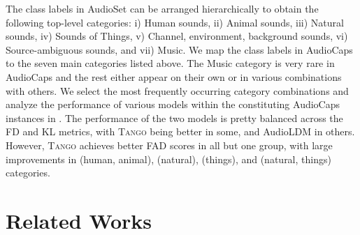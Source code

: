 \documentclass{article}
\newcommand{\model}{\textsc{Tango}}
\begin{document}
The class labels in AudioSet can be arranged hierarchically to obtain the following top-level categories: i) Human sounds, ii) Animal sounds, iii) Natural sounds, iv) Sounds of Things, v) Channel, environment, background sounds, vi) Source-ambiguous sounds, and vii) Music. We map the class labels in AudioCaps to the seven main categories listed above. The Music category is very rare in AudioCaps and the rest either appear on their own or in various combinations with others. We select the most frequently occurring category combinations and analyze the performance of various models within the constituting AudioCaps instances in . The performance of the two models is pretty balanced across the FD and KL metrics, with \model{} being better in some, and AudioLDM in others. However, \model{} achieves better FAD scores in all but one group, with large improvements in (human, animal), (natural), (things), and (natural, things) categories.

\section{Related Works}
\end{document}
